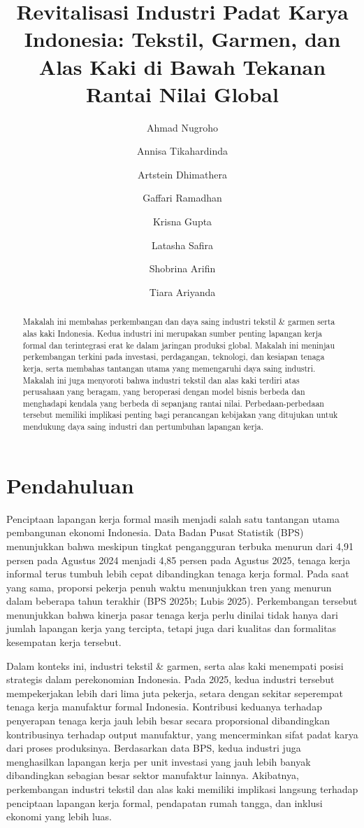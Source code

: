 \documentclass[
  manuscript=article,
  layout=publish,
  year=2026,
  volume=1,
]{den}
\title{Revitalisasi Industri Padat Karya Indonesia: Tekstil, Garmen, dan
Alas Kaki di Bawah Tekanan Rantai Nilai Global}
\author{Ahmad Nugroho}
\affiliation{Dewan Ekonomi Nasional}
\author{Annisa Tikahardinda}
\affiliation{Dewan Ekonomi Nasional}
\author{Artstein Dhimathera}
\affiliation{Dewan Ekonomi Nasional}
\author{Gaffari Ramadhan}
\affiliation{Dewan Ekonomi Nasional}
\author{Krisna Gupta \orcid{0000-0001-8695-0514}}
\affiliation{Dewan Ekonomi Nasional}
\author{Latasha Safira}
\affiliation{Dewan Ekonomi Nasional}
\author{Shobrina Arifin}
\affiliation{Dewan Ekonomi Nasional}
\author{Tiara Ariyanda}
\affiliation{Dewan Ekonomi Nasional}
\begin{document}
\begin{abstract}
Makalah ini membahas perkembangan dan daya saing industri tekstil \&
garmen serta alas kaki Indonesia. Kedua industri ini merupakan sumber
penting lapangan kerja formal dan terintegrasi erat ke dalam jaringan
produksi global. Makalah ini meninjau perkembangan terkini pada
investasi, perdagangan, teknologi, dan kesiapan tenaga kerja, serta
membahas tantangan utama yang memengaruhi daya saing industri. Makalah
ini juga menyoroti bahwa industri tekstil dan alas kaki terdiri atas
perusahaan yang beragam, yang beroperasi dengan model bisnis berbeda dan
menghadapi kendala yang berbeda di sepanjang rantai nilai.
Perbedaan-perbedaan tersebut memiliki implikasi penting bagi perancangan
kebijakan yang ditujukan untuk mendukung daya saing industri dan
pertumbuhan lapangan kerja.
\end{abstract}

\section{Pendahuluan}\label{pendahuluan}

Penciptaan lapangan kerja formal masih menjadi salah satu tantangan
utama pembangunan ekonomi Indonesia. Data Badan Pusat Statistik (BPS)
menunjukkan bahwa meskipun tingkat pengangguran terbuka menurun dari
4,91 persen pada Agustus 2024 menjadi 4,85 persen pada Agustus 2025,
tenaga kerja informal terus tumbuh lebih cepat dibandingkan tenaga kerja
formal. Pada saat yang sama, proporsi pekerja penuh waktu menunjukkan
tren yang menurun dalam beberapa tahun terakhir (BPS 2025b; Lubis 2025).
Perkembangan tersebut menunjukkan bahwa kinerja pasar tenaga kerja perlu
dinilai tidak hanya dari jumlah lapangan kerja yang tercipta, tetapi
juga dari kualitas dan formalitas kesempatan kerja tersebut.

Dalam konteks ini, industri tekstil \& garmen, serta alas kaki menempati
posisi strategis dalam perekonomian Indonesia. Pada 2025, kedua industri
tersebut mempekerjakan lebih dari lima juta pekerja, setara dengan
sekitar seperempat tenaga kerja manufaktur formal Indonesia. Kontribusi
keduanya terhadap penyerapan tenaga kerja jauh lebih besar secara
proporsional dibandingkan kontribusinya terhadap output manufaktur, yang
mencerminkan sifat padat karya dari proses produksinya. Berdasarkan data
BPS, kedua industri juga menghasilkan lapangan kerja per unit investasi
yang jauh lebih banyak dibandingkan sebagian besar sektor manufaktur
lainnya. Akibatnya, perkembangan industri tekstil dan alas kaki memiliki
implikasi langsung terhadap penciptaan lapangan kerja formal, pendapatan
rumah tangga, dan inklusi ekonomi yang lebih luas.
\end{document}
